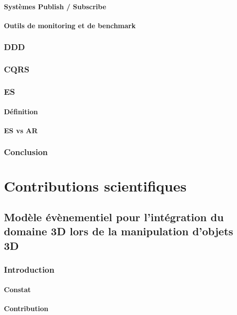 \documentclass[final,10pt,doubleside]{book}
\begin{document}
		\subsubsection{Systèmes Publish / Subscribe}
		\subsubsection{Outils de monitoring et de benchmark}
		
	\subsection{DDD}
	\subsection{CQRS}
	\subsection{ES}
		\subsubsection{Définition}
		\subsubsection{ES vs AR}
		
	\subsection{Conclusion}


\chapter{Contributions scientifiques}

\section{Modèle évènementiel pour l'intégration du domaine 3D lors de la 
	manipulation d'objets 3D}
	\subsection{Introduction}
		\subsubsection{Constat}
		\subsubsection{Contribution}
\end{document}

